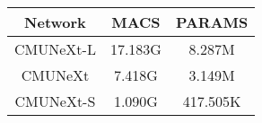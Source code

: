 \begin{tabular}{c|c|c}
    \toprule[1.1pt]
    Network & MACS & PARAMS 
    \\
    
    \midrule[1.1pt]

    CMUNeXt-L
    & 17.183G & 8.287M 	%
    \\
    
    
    CMUNeXt
    & 7.418G & 3.149M 	%
    \\
    
    CMUNeXt-S
    & 1.090G & 417.505K 	%
    \\

    \bottomrule[1.1pt]
\end{tabular}
